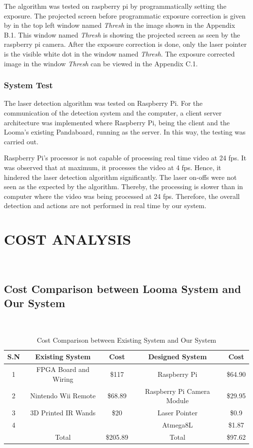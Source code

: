 \documentclass[12pt, a4paper]{article}
\begin{document}
	The algorithm was tested on raspberry pi by programmatically setting the exposure. The projected screen before programmatic exposure correction is given by in the top left window named \emph{Thresh} in the image shown in the Appendix B.1. This window named \emph{Thresh} is showing the projected screen as seen by the raspberry pi camera. After the exposure correction is done, only the laser pointer is the visible white dot in the window named \emph{Thresh}. The exposure corrected image in the window \emph{Thresh} can be viewed in the Appendix C.1.

\subsubsection{System Test}

The laser detection algorithm was tested on Raspberry Pi. For the communication of the detection system and the computer, a client server architecture was implemented where Raspberry Pi, being the client and the Looma’s existing Pandaboard, running as the server. In this way, the testing was carried out.

Raspberry Pi's processor is not capable of processing real time video at 24 fps. It was observed that at maximum, it processes the video at 4 fps. Hence, it hindered the laser detection algorithm significantly. The laser on-offs were not seen as the expected by the algorithm. Thereby, the processing  is slower than in computer where the video was being processed at 24 fps. Therefore, the overall detection and actions are not performed in real time by our system.

\newpage
\section{COST ANALYSIS}
~\\
\subsection{Cost Comparison between Looma System and Our System}
~\\
\begin{table}[ht]
\begin{tabular}{|c|c|c|c|c|}
\hline
	S.N  & Existing System & Cost & Designed System & Cost\\
\hline
	1 & FPGA Board and Wiring & \$117 & Raspberry Pi & \$64.90\\
\hline
	2 & Nintendo Wii Remote & \$68.89 & Raspberry Pi Camera Module & \$29.95 \\
\hline
	3 & 3D Printed IR Wands & \$20 & Laser Pointer & \$0.9\\
\hline
	4 &  &  & Atmega8L & \$1.87\\
\hline
	 & Total & \$205.89 & Total & \$97.62\\
\hline
\end{tabular}
\caption{Cost Comparison between Existing System and Our System}
\label{tb:sw}
\end{table}
\end{document}
